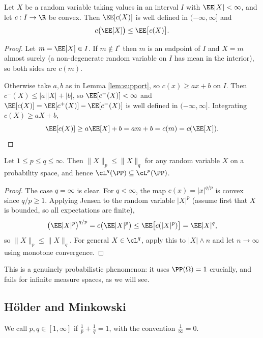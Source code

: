 \begin{theorem}\label{thm:jensen}
	Let $X$ be a random variable taking values in an interval $I$ with $\EE|X| < \infty$, and let $c : I \to \R$ be convex. Then $\EE[c(X)]$ is well defined in $(-\infty,\infty]$ and
	$$
	c\big(\EE[X]\big) \leq \EE\big[c(X)\big].
	$$
\end{theorem}
\begin{proof}
	Let $m = \EE[X] \in I$. If $m \notin I^\circ$ then $m$ is an endpoint of $I$ and $X = m$ almost surely (a non-degenerate random variable on $I$ has mean in the interior), so both sides are $c(m)$.

	Otherwise take $a,b$ as in Lemma \ref{lem:support}, so $c(x) \geq ax + b$ on $I$. Then $c^-(X) \leq |a||X| + |b|$, so $\EE[c^-(X)] < \infty$ and $\EE[c(X)] = \EE[c^+(X)]-\EE[c^-(X)]$ is well defined in $(-\infty,\infty]$. Integrating $c(X)\geq aX+b$,
	$$
	\EE[c(X)] \geq a\EE[X]+b = am+b = c(m) = c(\EE[X]). \qedhere
	$$
\end{proof}

\begin{corollary}\label{cor:lp-nested}
	Let $1 \leq p \leq q \leq \infty$. Then $\|X\|_p \leq \|X\|_q$ for any random variable $X$ on a probability space, and hence $\cL^q(\PP)\subseteq\cL^p(\PP)$.
\end{corollary}
\begin{proof}
	The case $q = \infty$ is clear. For $q<\infty$, the map $c(x) = |x|^{q/p}$ is convex since $q/p \geq 1$. Applying Jensen to the random variable $|X|^p$ (assume first that $X$ is bounded, so all expectations are finite),
	$$
	\big(\EE|X|^p\big)^{q/p} = c\big(\EE|X|^p\big) \leq \EE\big[c(|X|^p)\big] = \EE|X|^q,
	$$
	so $\|X\|_p \leq \|X\|_q$. For general $X \in \cL^q$, apply this to $|X|\wedge n$ and let $n \to\infty$ using monotone convergence.
\end{proof}

This is a genuinely probabilistic phenomenon: it uses $\PP(\Omega)=1$ crucially, and fails for infinite measure spaces, as we will see.

\subsection{H\"older and Minkowski}

\begin{definition}
	We call $p,q \in[1,\infty]$  if $\frac1p+\frac1q=1$, with the convention $\frac1\infty = 0$.
\end{definition}

